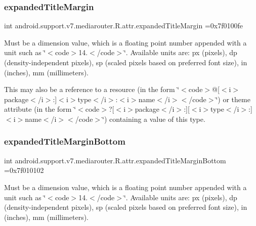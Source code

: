 \subsubsection{\texorpdfstring{expanded\+Title\+Margin}{expandedTitleMargin}}
{\footnotesize\ttfamily int android.\+support.\+v7.\+mediarouter.\+R.\+attr.\+expanded\+Title\+Margin =0x7f0100fe\hspace{0.3cm}{\ttfamily [static]}}

Must be a dimension value, which is a floating point number appended with a unit such as \char`\"{}$<$code$>$14.\+5sp$<$/code$>$\char`\"{}. Available units are\+: px (pixels), dp (density-\/independent pixels), sp (scaled pixels based on preferred font size), in (inches), mm (millimeters). 

This may also be a reference to a resource (in the form \char`\"{}$<$code$>$@\mbox{[}$<$i$>$package$<$/i$>$\+:\mbox{]}$<$i$>$type$<$/i$>$\+:$<$i$>$name$<$/i$>$$<$/code$>$\char`\"{}) or theme attribute (in the form \char`\"{}$<$code$>$?\mbox{[}$<$i$>$package$<$/i$>$\+:\mbox{]}\mbox{[}$<$i$>$type$<$/i$>$\+:\mbox{]}$<$i$>$name$<$/i$>$$<$/code$>$\char`\"{}) containing a value of this type. \mbox{\label{classandroid_1_1support_1_1v7_1_1mediarouter_1_1R_1_1attr_ad6238ed40f45c1ed7c04c31149a75682}} 
\subsubsection{\texorpdfstring{expanded\+Title\+Margin\+Bottom}{expandedTitleMarginBottom}}
{\footnotesize\ttfamily int android.\+support.\+v7.\+mediarouter.\+R.\+attr.\+expanded\+Title\+Margin\+Bottom =0x7f010102\hspace{0.3cm}{\ttfamily [static]}}

Must be a dimension value, which is a floating point number appended with a unit such as \char`\"{}$<$code$>$14.\+5sp$<$/code$>$\char`\"{}. Available units are\+: px (pixels), dp (density-\/independent pixels), sp (scaled pixels based on preferred font size), in (inches), mm (millimeters). 


